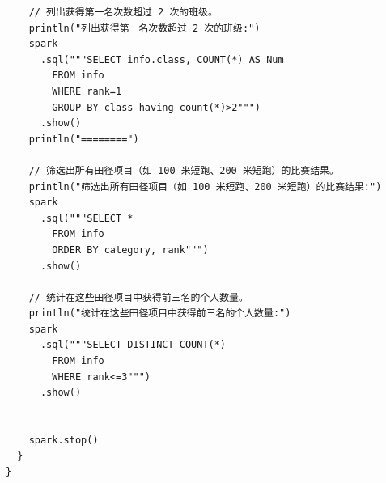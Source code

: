 \documentclass{article}
\begin{document}
\begin{center}
\begin{verbatim}
    // 列出获得第一名次数超过 2 次的班级。
    println("列出获得第一名次数超过 2 次的班级:")
    spark
      .sql("""SELECT info.class, COUNT(*) AS Num
        FROM info
        WHERE rank=1
        GROUP BY class having count(*)>2""")
      .show()
    println("========")

    // 筛选出所有田径项目（如 100 米短跑、200 米短跑）的比赛结果。
    println("筛选出所有田径项目（如 100 米短跑、200 米短跑）的比赛结果:")
    spark
      .sql("""SELECT *
        FROM info
        ORDER BY category, rank""")
      .show()

    // 统计在这些田径项目中获得前三名的个人数量。
    println("统计在这些田径项目中获得前三名的个人数量:")
    spark
      .sql("""SELECT DISTINCT COUNT(*)
        FROM info
        WHERE rank<=3""")
      .show()


    spark.stop()
  }
}
\end{verbatim}
\end{center}
\end{document}
